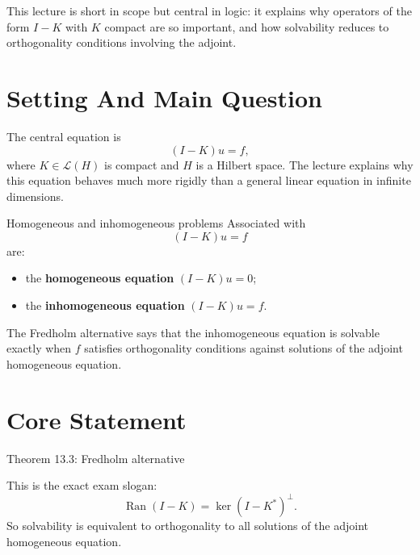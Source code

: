 \documentclass[11pt]{article}
\begin{document}

\vspace{0.8em}

\begin{focusbox}
This lecture is short in scope but central in logic: it explains why operators of the form $I-K$ with $K$ compact are so important, and how solvability reduces to orthogonality conditions involving the adjoint.
\end{focusbox}

\tableofcontents

\section{Setting And Main Question}

\begin{focusbox}
The central equation is
\[
(I-K)u=f,
\]
where $K\in\mathcal L(H)$ is compact and $H$ is a Hilbert space. The lecture explains why this equation behaves much more rigidly than a general linear equation in infinite dimensions.
\end{focusbox}

\begin{defbox}{Homogeneous and inhomogeneous problems}
Associated with
\[
(I-K)u=f
\]
are:
\begin{itemize}
\item the \textbf{homogeneous equation} $(I-K)u=0$;
\item the \textbf{inhomogeneous equation} $(I-K)u=f$.
\end{itemize}
The Fredholm alternative says that the inhomogeneous equation is solvable exactly when $f$ satisfies orthogonality conditions against solutions of the adjoint homogeneous equation.
\end{defbox}

\section{Core Statement}

\begin{thmbox}{Theorem 13.3: Fredholm alternative}
\thmFredholmAlternative
\end{thmbox}

\begin{focusbox}
This is the exact exam slogan:
\[
\operatorname{Ran}(I-K)=\ker(I-K^*)^{\perp}.
\]
So solvability is equivalent to orthogonality to all solutions of the adjoint homogeneous equation.
\end{focusbox}
\end{document}
